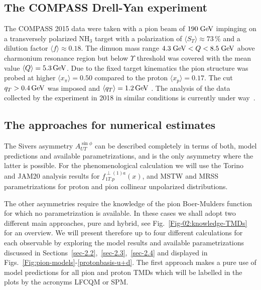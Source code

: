 \documentclass[a4paper]{article}
\newcommand{\la}{\langle}
\newcommand{\ra}{\rangle}
\begin{document}
\subsection{The COMPASS Drell-Yan experiment}
\label{section:kinematics}

The COMPASS 2015 data \cite{Aghasyan:2017jop} were taken with 
a pion beam  of $190 \; {\rm GeV}$ impinging on a transversely 
polarized NH$_3$ target with a polarization of $\la S_T\ra \approx 73\,\%$ 
and a dilution factor $\la f\ra \approx 0.18$.
The dimuon mass range $4.3 \; {\rm GeV}< Q <8.5 \; {\rm GeV}$ above  
charmonium resonance region but below $\Upsilon$ threshold was covered 
with the mean value $\la Q\ra=5.3\,{\rm GeV}$.  
Due to the fixed target kinematics the pion structure was probed at 
higher $\la x_\pi\ra =0.50$ compared to the proton $\la x_p\ra = 0.17$.
The cut $q_T>0.4\,{\rm GeV}$ was imposed and $\la q_T\ra = 1.2\,{\rm GeV}$ \cite{Aghasyan:2017jop}. The analysis of the data collected by the 
experiment in 2018 in similar conditions is currently under way~\cite{Parsamyan:2019wwd}.

\subsection{The approaches for numerical estimates}
\label{Sec3.2-approaches}

The Sivers asymmetry $A_{UT}^{\sin\phi}$ can be described completely
in terms of both, model predictions and available parametrizations, and is
the only asymmetry where the latter is possible. For the phenomenological
calculation we will use the Torino \cite{Anselmino:2013vqa} and JAM20
\cite{Cammarota:2020qcw} analysis results for $f_{1T.p}^{\perp(1)a}(x)$, 
and MSTW \cite{Martin:2009iq} and MRSS \cite{Sutton:1991ay} 
parametrizations for proton and pion collinear unpolarized distributions. 

The other asymmetries require the knowledge of the pion Boer-Mulders
function for which no parametrization is available. In these cases
we shall adopt two different main approaches, pure and hybrid,
see Fig.~\ref{Fig-02:knowledge-TMDs} for an overview.
We will present therefore up to 
four different calculations for each observable by exploring 
the model results and available parametrizations discussed in Sections~\ref{sec-2.2},~\ref{sec-2.3},~\ref{sec-2.4} and displayed in Figs.~\ref{Fig:pion-models}-\ref{protonbasis-u+d}.
The first approach makes a pure use of model predictions for all 
pion and proton TMDs which will be labelled in the plots by the
acronyms LFCQM or SPM.
\end{document}
